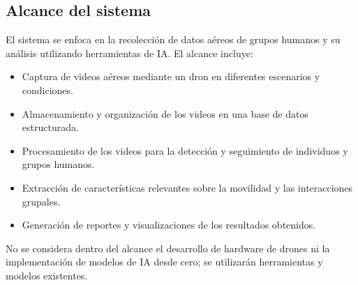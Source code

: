 	\subsection{Alcance del sistema}
	\noindent El sistema se enfoca en la recolecci\'on de datos a\'ereos de grupos humanos y su an\'alisis utilizando herramientas de IA. El alcance incluye:
	\begin{itemize}
		\item Captura de videos a\'ereos mediante un dron en diferentes escenarios y condiciones.
		\item Almacenamiento y organizaci\'on de los videos en una base de datos estructurada.
		\item Procesamiento de los videos para la detecci\'on y seguimiento de individuos y grupos humanos.
		\item Extracci\'on de caracter\'isticas relevantes sobre la movilidad y las interacciones grupales.
		\item Generaci\'on de reportes y visualizaciones de los resultados obtenidos.
	\end{itemize}
	\noindent No se considera dentro del alcance el desarrollo de hardware de drones ni la implementaci\'on de modelos de IA desde cero; se utilizar\'an herramientas y modelos existentes.

	\newpage